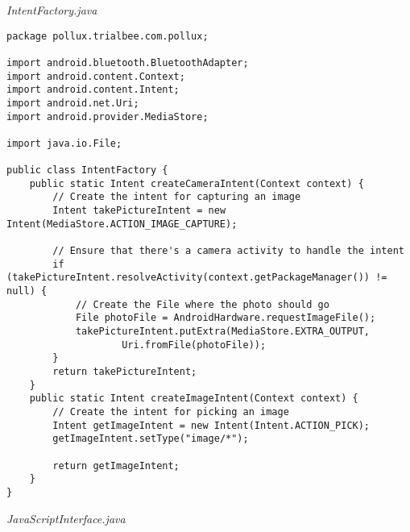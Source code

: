 \emph{IntentFactory.java}
\begin{lstlisting}
package pollux.trialbee.com.pollux;

import android.bluetooth.BluetoothAdapter;
import android.content.Context;
import android.content.Intent;
import android.net.Uri;
import android.provider.MediaStore;

import java.io.File;

public class IntentFactory {
    public static Intent createCameraIntent(Context context) {
        // Create the intent for capturing an image
        Intent takePictureIntent = new Intent(MediaStore.ACTION_IMAGE_CAPTURE);

        // Ensure that there's a camera activity to handle the intent
        if (takePictureIntent.resolveActivity(context.getPackageManager()) != null) {
            // Create the File where the photo should go
            File photoFile = AndroidHardware.requestImageFile();
            takePictureIntent.putExtra(MediaStore.EXTRA_OUTPUT,
                    Uri.fromFile(photoFile));
        }
        return takePictureIntent;
    }
    public static Intent createImageIntent(Context context) {
        // Create the intent for picking an image
        Intent getImageIntent = new Intent(Intent.ACTION_PICK);
        getImageIntent.setType("image/*");

        return getImageIntent;
    }
}
\end{lstlisting}
\emph{JavaScriptInterface.java}

